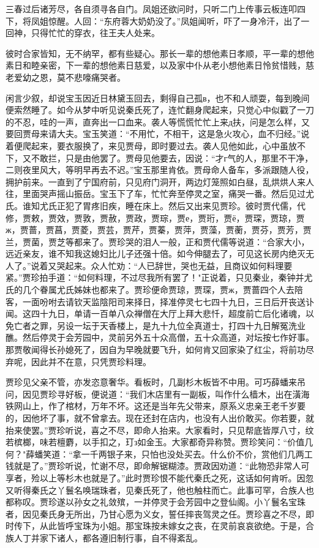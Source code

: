 三春过后诸芳尽，各自须寻各自门。凤姐还欲问时，只听二门上传事云板连叩四下，将凤姐惊醒。人回：“东府蓉大奶奶没了。”凤姐闻听，吓了一身冷汗，出了一回神，只得忙忙的穿衣，往王夫人处来。

彼时合家皆知，无不纳罕，都有些疑心。那长一辈的想他素日孝顺，平一辈的想他素日和睦亲密，下一辈的想他素日慈爱，以及家中仆从老小想他素日怜贫惜贱，慈老爱幼之恩，莫不悲嚎痛哭者。

闲言少叙，却说宝玉因近日林黛玉回去，剩得自己孤в，也不和人顽耍，每到晚间便索然睡了。如今从梦中听见说秦氏死了，连忙翻身爬起来，只觉心中似戳了一刀的不忍，哇的一声，直奔出一口血来。袭人等慌慌忙忙上来д扶，问是怎么样，又要回贾母来请大夫。宝玉笑道：“不用忙，不相干，这是急火攻心，血不归经。”说着便爬起来，要衣服换了，来见贾母，即时要过去。袭人见他如此，心中虽放不下，又不敢拦，只是由他罢了。贾母见他要去，因说：“才г气的人，那里不干净，二则夜里风大，等明早再去不迟。”宝玉那里肯依。贾母命人备车，多派跟随人役，拥护前来。一直到了宁国府前，只见府门洞开，两边灯笼照如白昼，乱烘烘人来人往，里面哭声摇山振岳。宝玉下了车，忙忙奔至停灵之室，痛哭一番。然后见过尤氏。谁知尤氏正犯了胃疼旧疾，睡在床上。然后又出来见贾珍。彼时贾代儒，代修，贾敕，贾效，贾敦，贾赦，贾政，贾琮，贾е，贾珩，贾ё，贾琛，贾琼，贾ж，贾蔷，贾菖，贾菱，贾芸，贾芹，贾蓁，贾萍，贾藻，贾蘅，贾芬，贾芳，贾兰，贾菌，贾芝等都来了。贾珍哭的泪人一般，正和贾代儒等说道：“合家大小，远近亲友，谁不知我这媳妇比儿子还强十倍。如今伸腿去了，可见这长房内绝灭无人了。”说着又哭起来。众人忙劝：“人已辞世，哭也无益，且商议如何料理要紧。”贾珍拍手道：“如何料理，不过尽我所有罢了！"正说着，只见秦业，秦钟并尤氏的几个眷属尤氏姊妹也都来了。贾珍便命贾琼，贾琛，贾ж，贾蔷四个人去陪客，一面吩咐去请钦天监陰阳司来择日，择准停灵七七四十九日，三日后开丧送讣闻。这四十九日，单请一百单八众禅僧在大厅上拜大悲忏，超度前亡后化诸魂，以免亡者之罪，另设一坛于天香楼上，是九十九位全真道士，打四十九日解冤洗业醮。然后停灵于会芳园中，灵前另外五十众高僧，五十众高道，对坛按七作好事。那贾敬闻得长孙媳死了，因自为早晚就要飞升，如何肯又回家染了红尘，将前功尽弃呢，因此并不在意，只凭贾珍料理。

贾珍见父亲不管，亦发恣意奢华。看板时，几副杉木板皆不中用。可巧薛蟠来吊问，因见贾珍寻好板，便说道：“我们木店里有一副板，叫作什么樯木，出在潢海铁网山上，作了棺材，万年不坏。这还是当年先父带来，原系义忠亲王老千岁要的，因他坏了事，就不曾拿去。现在还封在店内，也没有人出价敢买。你若要，就抬来使罢。”贾珍听说，喜之不尽，即命人抬来。大家看时，只见帮底皆厚八寸，纹若槟榔，味若檀麝，以手扣之，玎з如金玉。大家都奇异称赞。贾珍笑问：“价值几何？"薛蟠笑道：“拿一千两银子来，只怕也没处买去。什么价不价，赏他们几两工钱就是了。”贾珍听说，忙谢不尽，即命解锯糊漆。贾政因劝道：“此物恐非常人可享者，殓以上等杉木也就是了。”此时贾珍恨不能代秦氏之死，这话如何肯听。因忽又听得秦氏之丫鬟名唤瑞珠者，见秦氏死了，他也触柱而亡。此事可罕，合族人也都称叹。贾珍遂以孙女之礼敛殡，一并停灵于会芳园中之登仙阁。小丫鬟名宝珠者，因见秦氏身无所出，乃甘心愿为义女，誓任摔丧驾灵之任。贾珍喜之不尽，即时传下，从此皆呼宝珠为小姐。那宝珠按未嫁女之丧，在灵前哀哀欲绝。于是，合族人丁并家下诸人，都各遵旧制行事，自不得紊乱。

